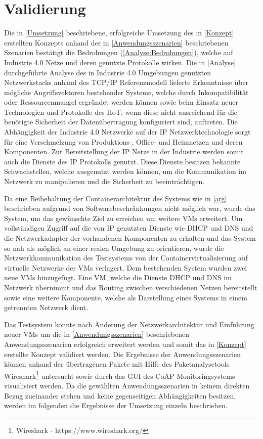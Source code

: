 \chapter{Validierung}
Die in \autoref{Umsetzung} beschriebene, erfolgreiche Umsetzung des in \autoref{Konzept} erstellten Konzepts anhand der in \autoref{Anwendungsszenarien} beschriebenen Szenarien bestätigt die Bedrohungen (\autoref{Analyse:Bedrohungen}), welche auf Industrie 4.0 Netze und deren genutzte Protokolle wirken. Die in \autoref{Analyse} durchgeführte Analyse des in Industrie 4.0 Umgebungen genutzten Netzwerkstacks anhand des \ac{TCP}/\ac{IP} Referenzmodell lieferte Erkenntnisse über mögliche Angriffsvektoren bestehender Systeme, welche durch Inkompatibilität oder Ressourcenmangel ergründet werden können sowie beim Einsatz neuer Technologien und Protokolle des \ac{IIoT}, wenn diese nicht ausreichend für die benötigte Sicherheit der Datenübertragung konfiguriert sind, auftreten. Die Abhängigkeit der Industrie 4.0 Netzwerke auf der \ac{IP} Netzwerktechnologie sorgt für eine Verschmelzung von Produktions-, Office- und Heimnetzen und deren Komponenten. Zur Bereitstellung der \ac{IP} Netze in der Industrie werden somit auch die Dienste des \ac{IP} Protokolls genutzt. Diese Dienste besitzen bekannte Schwachstellen, welche ausgenutzt werden können, um die Kommunikation im Netzwerk zu manipulieren und die Sicherheit zu beeinträchtigen. 

Da eine Beibehaltung der Containerarchitektur des Systems wie in \autoref{arg} beschrieben aufgrund von Softwarebeschränkungen nicht möglich war, wurde das System, um das gewünschte Ziel zu erreichen um weitere \ac{VM}s erweitert. Um vollständigen Zugriff auf die von \ac{IP} genutzten Dienste wie \ac{DHCP} und \ac{DNS} und die Netzwerkadapter der vorhandenen Komponenten zu erhalten und das System so nah als möglich an einer realen Umgebung zu orientieren, wurde die Netzwerkkommunikation des Testsystems von der Containervirtualisierung auf virtuelle Netzwerke der \ac{VM}s verlagert. Dem bestehenden System wurden zwei neue \ac{VM}s hinzugefügt. Eine \ac{VM}, welche die Dienste \ac{DHCP} und \ac{DNS} im Netzwerk übernimmt und das Routing zwischen verschiedenen Netzen bereitstellt sowie eine weitere Komponente, welche als Darstellung eines Systems in einem getrennten Netzwerk dient.

Das Testsystem konnte nach Änderung der Netzwerkarchitektur und Einführung neuer \ac{VM}s um die in \autoref{Anwendungsszenarien} beschriebenen Anwendungsszenarien erfolgreich erweitert werden und somit das in \autoref{Konzept} erstellte Konzept validiert werden. Die Ergebnisse der Anwendungsszenarien können anhand der übertragenen Pakete mit Hilfe des Paketanalysetools Wireshark\footnote{Wireshark - https://www.wireshark.org/} untersucht sowie durch das \ac{GUI} des \ac{CoAP} Monitoringsystems visualisiert werden. Da die gewählten Anwendungsszenarien in keinem direkten Bezug zueinander stehen und keine gegenseitigen Abhängigkeiten besitzen, werden im folgenden die Ergebnisse der Umsetzung einzeln beschrieben.

